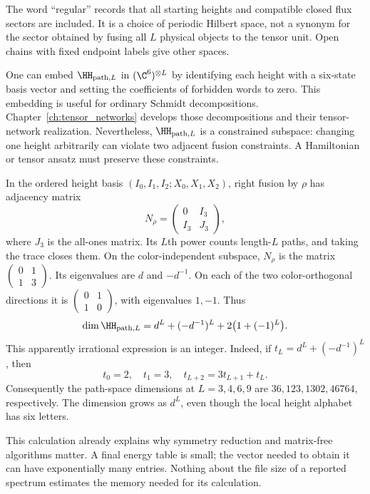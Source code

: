The word ``regular'' records that all starting heights and compatible closed
flux sectors are included. It is a choice of periodic Hilbert space, not a
synonym for the sector obtained by fusing all $L$ physical objects to the
tensor unit. Open chains with fixed endpoint labels give other spaces.

One can embed $\HH_{\mathrm{path},L}$ in $(\C^6)^{\otimes L}$ by identifying each height
with a six-state basis vector and setting the coefficients of forbidden words
to zero. This embedding is useful for ordinary Schmidt decompositions.
Chapter~\ref{ch:tensor_networks} develops those decompositions and their
tensor-network realization.
Nevertheless, $\HH_{\mathrm{path},L}$ is a constrained subspace: changing one height
arbitrarily can violate two adjacent fusion constraints. A Hamiltonian or
tensor ansatz must preserve these constraints.

\begin{example}
In the ordered height basis $(I_0,I_1,I_2;X_0,X_1,X_2)$, right fusion by
$\rho$ has adjacency matrix
\[
 N_\rho=\begin{pmatrix}0&I_3\\I_3&J_3\end{pmatrix},
\]
where $J_3$ is the all-ones matrix. Its $L$th power counts length-$L$ paths,
and taking the trace closes them. On the color-independent subspace,
$N_\rho$ is the matrix $\left(\begin{smallmatrix}0&1\\1&3\end{smallmatrix}\right)$.
Its eigenvalues are $d$ and $-d^{-1}$. On each of the two color-orthogonal
directions it is $\left(\begin{smallmatrix}0&1\\1&0\end{smallmatrix}\right)$,
with eigenvalues $1,-1$. Thus
\begin{equation}
 \dim\HH_{\mathrm{path},L}=d^L+(-d^{-1})^L+2\bigl(1+(-1)^L\bigr).
 \label{eq:path-dimension}
\end{equation}
This apparently irrational expression is an integer. Indeed, if
$t_L=d^L+(-d^{-1})^L$, then
\[
 t_0=2,\quad t_1=3,\quad t_{L+2}=3t_{L+1}+t_L.
\]
Consequently the path-space dimensions at $L=3,4,6,9$ are
$36,123,1302,46764$, respectively. The dimension grows as $d^L$,
even though the local height alphabet has six letters.
\end{example}

This calculation already explains why symmetry reduction and matrix-free
algorithms matter. A final energy table is small; the vector needed to obtain
it can have exponentially many entries. Nothing about the file size of a
reported spectrum estimates the memory needed for its calculation.

